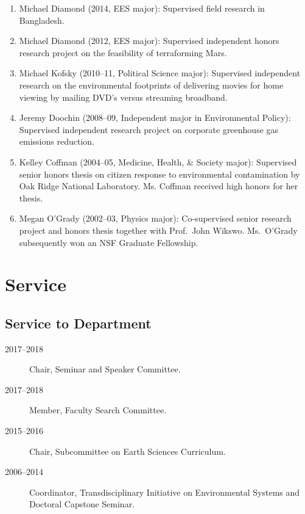 \documentclass[10pt]{article}
\begin{document}
\begin{enumerate}
    \item Michael Diamond (2014, EES major): Supervised field research in Bangladesh.
    \item Michael Diamond (2012, EES major): Supervised independent honors research project on the feasibility of terraforming Mars.
    \item Michael Kofsky (2010--11, Political Science major): Supervised independent research on the environmental footprints of delivering movies for home viewing by mailing DVD's versus streaming broadband.
    \item Jeremy Doochin (2008--09, Independent major in Environmental Policy): Supervised independent research project on corporate greenhouse gas emissions reduction.
    \item Kelley Coffman (2004--05, Medicine, Health, \& Society major): Supervised senior honors thesis on citizen response to environmental contamination by Oak Ridge National Laboratory. Ms. Coffman received high honors for her thesis.
    \item Megan O'Grady (2002--03, Physics major): Co-supervised senior research project and honors thesis together with Prof.~John Wikswo. Ms.~O'Grady subsequently won an NSF Graduate Fellowship.
    \end{enumerate}
\fi

\section{Service}
\iffalse
    \subsection{Service to Department}
        \begin{description}
            \item[2017--2018] Chair, Seminar and Speaker Committee.
            \item[2017--2018] Member, Faculty Search Committee.
            \item[2015--2016] Chair, Subcommittee on Earth Sciences Curriculum.
            \item[2006--2014] Coordinator, Transdisciplinary Initiative on Environmental Systems and Doctoral Capstone Seminar.
        \end{description}
\end{document}
